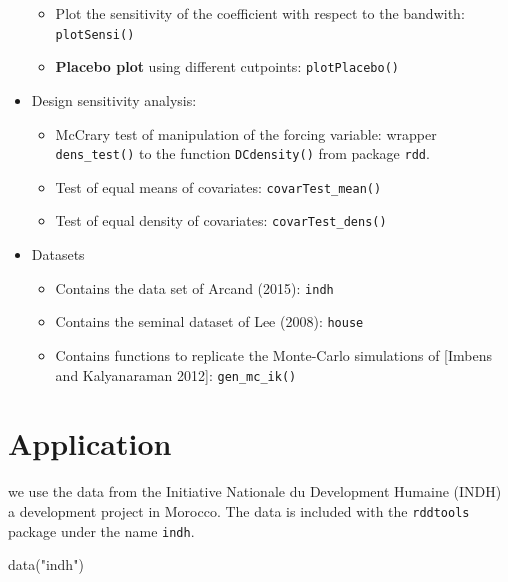 \documentclass[article]{jss}
\begin{document}
\begin{itemize}
  \begin{itemize}
  \itemsep1pt\parskip0pt
  \item
    Plot the sensitivity of the coefficient with respect to the
    bandwith: \texttt{plotSensi()}
  \item
    \textbf{Placebo plot} using different cutpoints:
    \texttt{plotPlacebo()}
  \end{itemize}
\item
  Design sensitivity analysis:

  \begin{itemize}
  \itemsep1pt\parskip0pt
  \item
    McCrary test of manipulation of the forcing variable: wrapper
    \texttt{dens\_test()} to the function \texttt{DCdensity()} from
    package \texttt{rdd}.
  \item
    Test of equal means of covariates: \texttt{covarTest\_mean()}
  \item
    Test of equal density of covariates: \texttt{covarTest\_dens()}
  \end{itemize}
\item
  Datasets

  \begin{itemize}
  \itemsep1pt\parskip0pt
  \item
    Contains the data set of Arcand (2015): \texttt{indh}
  \item
    Contains the seminal dataset of Lee (2008): \texttt{house}
  \item
    Contains functions to replicate the Monte-Carlo simulations of
    {[}Imbens and Kalyanaraman 2012{]}: \texttt{gen\_mc\_ik()}
  \end{itemize}
\end{itemize}

\section{Application}\label{application}

we use the data from the Initiative Nationale du Development Humaine
(INDH) a development project in Morocco. The data is included with the
\texttt{rddtools} package under the name \texttt{indh}.

\begin{CodeChunk}
\begin{CodeInput}
data("indh")
\end{CodeInput}
\end{CodeChunk}
\end{document}

